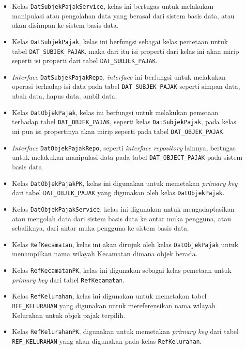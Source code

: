 \documentclass[pdftex,12pt, oneside]{article}
\begin{document}
\begin{itemize}
	\item Kelas \texttt{DatSubjekPajakService}, kelas ini bertugas untuk melakukan manipulasi atau pengolahan data yang berasal dari sistem basis data, atau akan disimpan ke sistem basis data.
	\item Kelas \texttt{DatSubjekPajak}, kelas ini berfungsi sebagai kelas pemetaan untuk tabel \texttt{DAT\_SUBJEK\_PAJAK}, maka dari itu isi properti dari kelas ini akan mirip seperti isi properti dari tabel \texttt{DAT\_SUBJEK\_PAJAK}.
	\item \textit{Interface} \texttt{DatSubjekPajakRepo}, \textit{interface} ini berfungsi untuk melakukan operasi terhadap isi data pada tabel \texttt{DAT\_SUBJEK\_PAJAK} seperti simpan data, ubah data, hapus data, ambil data.
	\item Kelas \texttt{DatObjekPajak}, kelas ini berfungsi untuk melakukan pemetaan terhadap tabel \texttt{DAT\_OBJEK\_PAJAK}, seperti kelas \texttt{DatSubjekPajak}, pada kelas ini pun isi propertinya akan mirip seperti pada tabel \texttt{DAT\_OBJEK\_PAJAK}.
	\item \textit{Interface} \texttt{DatObjekPajakRepo}, seperti \textit{interface repository} lainnya, bertugas untuk melakukan manipulasi data pada tabel \texttt{DAT\_OBJECT\_PAJAK} pada sistem basis data.
	\item Kelas \texttt{DatObjekPajakPK}, kelas ini digunakan untuk memetakan \textit{primary key} dari tabel \texttt{DAT\_OBJEK\_PAJAK} yang digunakan oleh kelas \texttt{DatObjekPajak}.
	\item Kelas \texttt{DatObjekPajakService}, kelas ini digunakan untuk mengadaptasikan atau mengolah data dari sistem basis data ke antar muka pengguna, atau sebaliknya, dari antar muka pengguna ke sistem basis data.
	\item Kelas \texttt{RefKecamatan}, kelas ini akan dirujuk oleh kelas \texttt{DatObjekPajak} untuk menampilkan nama wilayah Kecamatan dimana objek berada.
	\item Kelas \texttt{RefKecamatanPK}, kelas ini digunakan sebagai kelas pemetaan untuk \textit{primary key} dari tabel \texttt{RefKecamatan}.
	\item Kelas \texttt{RefKelurahan}, kelas ini digunakan untuk memetakan tabel \texttt{REF\_KELURAHAN} yang digunakan untuk mereferensikan nama wilayah Kelurahan untuk objek pajak terpilih.
	\item Kelas \texttt{RefKelurahanPK}, digunakan untuk memetakan \textit{primary key} dari tabel \texttt{REF\_KELURAHAN} yang akan digunakan pada kelas \texttt{RefKelurahan}.
\end{itemize}
\end{document}
